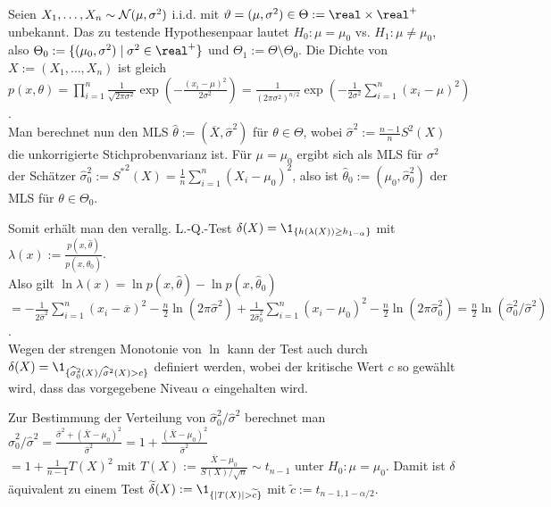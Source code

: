 \linie

\begin{Bsp}
    Seien $X_1, \dotsc, X_n \sim \mathcal{N}(\mu, \sigma^2)$ i.i.d.
    mit $\theta = (\mu, \sigma^2) \in \Theta := \real \times \real^+$ unbekannt.
    Das zu testende Hypothesenpaar lautet $H_0\colon \mu = \mu_0$ vs. $H_1\colon \mu \not= \mu_0$,
    also $\Theta_0 := \{(\mu_0, \sigma^2) \;|\; \sigma^2 \in \real^+\}$ und
    $\Theta_1 := \Theta \setminus \Theta_0$.
    Die Dichte von $X := (X_1, \dotsc, X_n)$ ist gleich\\
    $p(x, \theta) = \prod_{i=1}^n \frac{1}{\sqrt{2\pi\sigma^2}}
    \exp\!\left(-\frac{(x_i - \mu)^2}{2\sigma^2}\right)
    = \frac{1}{(2\pi\sigma^2)^{n/2}} \exp\!\left(-\frac{1}{2\sigma^2}
    \sum_{i=1}^n (x_i - \mu)^2\right)$.\\
    Man berechnet nun den MLS $\widehat{\theta} := (\overline{X}, \widehat{\sigma}^2)$
    für $\theta \in \Theta$, wobei
    $\widehat{\sigma}^2 := \frac{n-1}{n} S^2(X)$ die unkorrigierte Stichprobenvarianz ist.
    Für $\mu = \mu_0$ ergibt sich als MLS für $\sigma^2$ der Schätzer
    $\widehat{\sigma}_0^2 := {S^\ast}^2(X) = \frac{1}{n} \sum_{i=1}^n (X_i - \mu_0)^2$,
    also ist $\widehat{\theta}_0 := (\mu_0, \widehat{\sigma}_0^2)$ der MLS für
    $\theta \in \Theta_0$.

    Somit erhält man den verallg. L.-Q.-Test $\delta(X) = \1_{\{h(\lambda(X)) \ge h_{1-\alpha}\}}$
    mit $\lambda(x) := \frac{p(x, \widehat{\theta})}{p(x, \widehat{\theta}_0)}$.\\
    Also gilt $\ln \lambda(x)
    = \ln p(x, \widehat{\theta}) - \ln p(x, \widehat{\theta}_0)$\\
    $= -\frac{1}{2\widehat{\sigma}^2} \sum_{i=1}^n (x_i - \overline{x})^2 -
    \frac{n}{2} \ln(2\pi\widehat{\sigma}^2) +
    \frac{1}{2\widehat{\sigma}_0^2} \sum_{i=1}^n (x_i - \mu_0)^2 -
    \frac{n}{2} \ln(2\pi\widehat{\sigma}_0^2)
    = \frac{n}{2} \ln(\widehat{\sigma}_0^2/\widehat{\sigma}^2)$.\\
    Wegen der strengen Monotonie von $\ln$ kann der Test auch
    durch $\delta(X) = \1_{\{\widehat{\sigma}_0^2(X)/\widehat{\sigma}^2(X) > c\}}$
    definiert werden, wobei der kritische Wert $c$ so gewählt wird,
    dass das vorgegebene Niveau $\alpha$ eingehalten wird.

    Zur Bestimmung der Verteilung von $\widehat{\sigma}_0^2/\widehat{\sigma}^2$
    berechnet man
    $\widehat{\sigma}_0^2/\widehat{\sigma}^2
    = \frac{\widehat{\sigma}^2 + (\overline{X} - \mu_0)^2}{\widehat{\sigma}^2}
    = 1 + \frac{(\overline{X} - \mu_0)^2}{\widehat{\sigma}^2}$\\
    $= 1 + \frac{1}{n-1} T(X)^2$ mit $T(X) := \frac{\overline{X} - \mu_0}{S(X)/\sqrt{n}} \sim
    t_{n-1}$ unter $H_0\colon \mu = \mu_0$.
    Damit ist $\delta$ äquivalent zu einem Test
    $\widetilde{\delta}(X) := \1_{\{|T(X)| > \widetilde{c}\}}$ mit
    $\widetilde{c} := t_{n-1,1-\alpha/2}$.


\end{Bsp}
